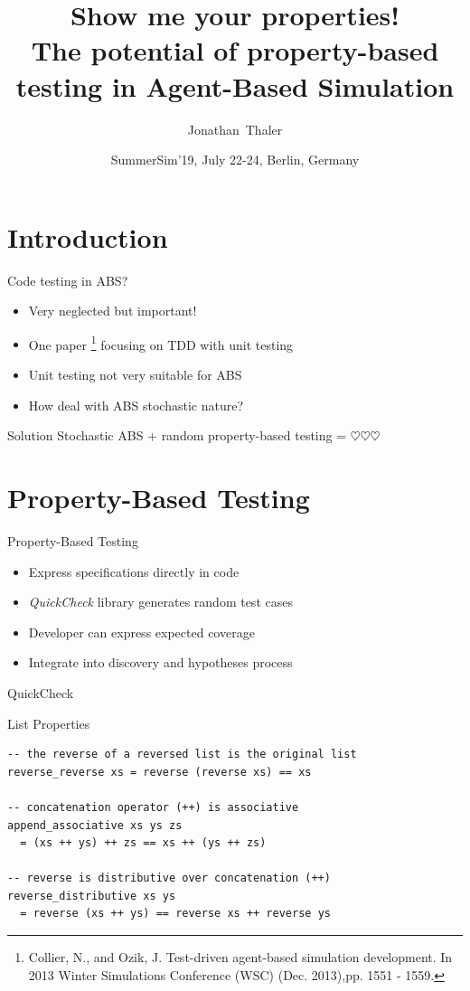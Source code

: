 \documentclass{beamer} %
\title[Show me your properties! The potential of property-based testing in Agent-Based Simulation] 
{%
  Show me your properties! \\ \tiny{The potential of property-based testing in Agent-Based Simulation}
}
\author[Thaler]
{
  Jonathan~Thaler
}
\institute[University of Nottingham, Nottingham, United Kingdom]
{
  University of Nottingham, Nottingham, United Kingdom
}
\date[SummerSim'19, July 22-24, Berlin, Germany]
{SummerSim'19, July 22-24, Berlin, Germany}
\begin{document}
\begin{frame}
  \titlepage
\end{frame}

\section{Introduction}
\begin{frame}{Code testing in ABS?}
\begin{itemize}
	\item Very neglected but important!
	\item One paper \footnote{Collier, N., and Ozik, J. Test-driven agent-based simulation development. In 2013 Winter Simulations Conference (WSC) (Dec. 2013),pp. 1551 - 1559.} focusing on TDD with unit testing
  	\item Unit testing not very suitable for ABS
  	\item How deal with ABS stochastic nature?
\end{itemize}

\begin{block}{Solution}
Stochastic ABS + random property-based testing = $\heartsuit \heartsuit \heartsuit$
\end{block}
\end{frame}

\section{Property-Based Testing}
\begin{frame}{Property-Based Testing}
  \begin{itemize}
    \item Express specifications directly in code
    \item \textit{QuickCheck} library generates random test cases
    \item Developer can express expected coverage
    \item Integrate into discovery and hypotheses process
  \end{itemize}
\end{frame}

\begin{frame}[fragile]{QuickCheck}
\begin{block}{List Properties}
\begin{verbatim}
-- the reverse of a reversed list is the original list
reverse_reverse xs = reverse (reverse xs) == xs

-- concatenation operator (++) is associative
append_associative xs ys zs 
  = (xs ++ ys) ++ zs == xs ++ (ys ++ zs)

-- reverse is distributive over concatenation (++)
reverse_distributive xs ys 
  = reverse (xs ++ ys) == reverse xs ++ reverse ys
\end{verbatim}
\end{block}
\end{frame}
\end{document}
